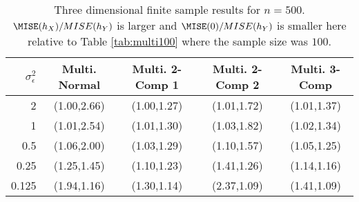 \begin{table}[ht]
\centering
\begin{tabular}{r|cccc}
  \hline
$\sigma_{\epsilon}^2$ & Multi. Normal & Multi. 2-Comp 1 & Multi. 2-Comp 2 & Multi. 3-Comp \\ 
  \hline
2 & (1.00,2.66) & (1.00,1.27) & (1.01,1.72) & (1.01,1.37) \\ 
  1 & (1.01,2.54) & (1.01,1.30) & (1.03,1.82) & (1.02,1.34) \\ 
  0.5 & (1.06,2.00) & (1.03,1.29) & (1.10,1.57) & (1.05,1.25) \\ 
  0.25 & (1.25,1.45) & (1.10,1.23) & (1.41,1.26) & (1.14,1.16) \\ 
  0.125 & (1.94,1.16) & (1.30,1.14) & (2.37,1.09) & (1.41,1.09) \\ 
   \hline
\end{tabular}
\caption{Three dimensional finite sample results for $n=500$. $\MISE(h_X) / MISE(h_Y)$ is larger and $\MISE(0)/MISE(h_Y)$ is smaller here relative to Table \ref{tab:multi100} where the sample size was $100$.} 
\label{tab:multi500}
\end{table}

